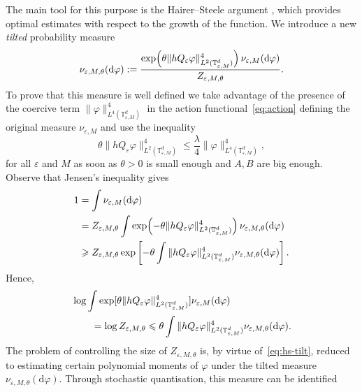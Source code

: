 \documentclass{article}
\numberwithin{equation}{section}
\newcommand{\assign}{:=}
\newcommand{\mathd}{\mathrm{d}}
\theoremstyle{plain}
\theoremstyle{definition}
\begin{document}
The main tool for this purpose is the Hairer--Steele argument
{\cite{hairerPhiMeasureHas2022}}, which provides optimal estimates with
respect to the growth of the function. We introduce a new \textit{tilted}
probability measure
\begin{equation}
  \nu_{\varepsilon, M, \theta} (\mathd \varphi) \assign \frac{\exp\Bigl(\theta \| hQ_{\varepsilon}
  	\varphi \|_{L^2 (\mathbb{T}^d_{\varepsilon, M})}^4 \Bigr)\,
  \nu_{\varepsilon, M} (\mathd \varphi)}{Z_{\varepsilon, M, \theta}} .
  \label{eq:exp-tilt}
\end{equation}
To prove that this measure is well defined we take advantage
of the presence of the coercive term $\| \varphi \|_{L^4
(\mathbb{T}^d_{\varepsilon, M})}^4$ in the action functional~\eqref{eq:action}
defining the original measure $\nu_{\varepsilon, M}$ and use the inequality
\[ \theta \| hQ_{\varepsilon} \varphi \|_{L^2
   (\mathbb{T}^d_{\varepsilon, M})}^4 \leqslant \frac{\lambda}{4}  \| \varphi
   \|_{L^4 (\mathbb{T}^d_{\varepsilon, M})}^4, \]
for all $\varepsilon$ and $M$ as soon as $\theta > 0$ is small
enough and $A, B$ are big enough. Observe that Jensen's inequality gives
\begin{align*}
  1 &= \int \nu_{\varepsilon, M} (\mathd \varphi)\\
    &= Z_{\varepsilon, M, \theta}
   \int \exp\Bigl(- \theta \| hQ_{\varepsilon} \varphi \|_{L^2
   (\mathbb{T}^d_{\varepsilon, M})}^4\Bigr)\, \nu_{\varepsilon, M, \theta} (\mathd
   \varphi)\\
    &\geqslant Z_{\varepsilon, M, \theta} \exp \left[ - \theta \int \|
   hQ_{\varepsilon} \varphi \|_{L^2 (\mathbb{T}^d_{\varepsilon, M})}^4
   \nu_{\varepsilon, M, \theta} (\mathd \varphi) \right] .
\end{align*}
Hence,
\begin{align}
  &\log \int \exp [\theta \| hQ_{\varepsilon} \varphi \|_{L^2
  (\mathbb{T}^d_{\varepsilon, M})}^4] \nu_{\varepsilon, M} (\mathd \varphi)
  \notag\\
  &\qquad = \log Z_{\varepsilon, M, \theta}
  \leqslant \theta \int \| hQ_{\varepsilon}
  \varphi \|_{L^2 (\mathbb{T}^d_{\varepsilon, M})}^4
  \nu_{\varepsilon, M, \theta} (\mathd \varphi) . \label{eq:hs-tilt}
\end{align}
The problem of controlling the size of $Z_{\varepsilon, M, \theta}$ is, by
virtue of~\eqref{eq:hs-tilt}, reduced to estimating certain polynomial moments
of $\varphi$ under the tilted measure $\nu_{\varepsilon, M, \theta} (\mathd
\varphi)$. Through stochastic quantisation, this measure can be identified
\end{document}
